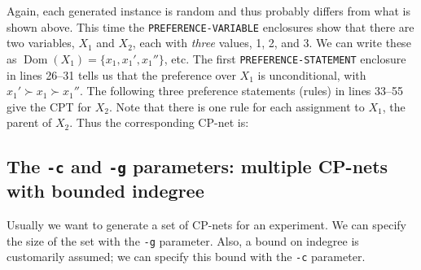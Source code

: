 \documentclass{article}
\DeclareMathOperator{\dom}{Dom}
\begin{document}
Again, each generated instance is random and thus probably differs
from what is shown above.  This time the \texttt{PREFERENCE-VARIABLE}
enclosures show that there are two variables, $X_1$ and $X_2$, each
with \emph{three} values, 1, 2, and 3.  We can write these as
$\dom(X_1) = \{x_1, x_1', x_1''\}$, etc.
The first \texttt{PREFERENCE-STATEMENT} enclosure in lines 26--31
tells us that the preference over $X_1$ is unconditional, with
$x_1' \succ x_1 \succ x_1''$.
The following three preference statements (rules) in lines 33--55 give
the CPT for $X_2$.  Note that there is one rule for each assignment to
$X_1$, the parent of $X_2$.  Thus the corresponding CP-net is:

\begin{center}
\end{center}

\subsection{The \texttt{-c} and \texttt{-g} parameters: multiple CP-nets with bounded indegree}

Usually we want to generate a set of CP-nets for an experiment.
We can specify the size of the set with the \texttt{-g} parameter. 
Also, a bound on indegree is customarily assumed; we can specify this
bound with the \texttt{-c} parameter.
\end{document}
